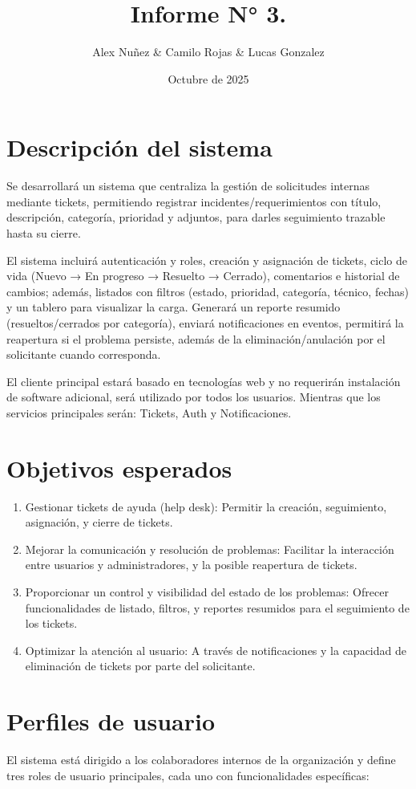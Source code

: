 \documentclass[letter,12pt]{article}
\title{\Huge{Informe N° 3.}}
\author{Alex Nuñez  \& Camilo Rojas \& Lucas Gonzalez}
\date{Octubre de 2025}
\begin{document}
\maketitle
\tableofcontents
\newpage

\section{Descripción del sistema}
Se desarrollará un sistema que centraliza la gestión de solicitudes internas mediante tickets, permitiendo registrar incidentes/requerimientos con título, descripción, categoría, prioridad y adjuntos, para darles seguimiento trazable hasta su cierre.

El sistema incluirá autenticación y roles, creación y asignación de tickets, ciclo de vida (Nuevo → En progreso → Resuelto → Cerrado), comentarios e historial de cambios; además, listados con filtros (estado, prioridad, categoría, técnico, fechas) y un tablero para visualizar la carga. Generará un reporte resumido (resueltos/cerrados por categoría), enviará notificaciones en eventos, permitirá la reapertura si el problema persiste, además de la eliminación/anulación por el solicitante cuando corresponda.

El cliente principal estará basado en tecnologías web y no requerirán instalación de software adicional, será utilizado por todos los usuarios. Mientras que los servicios principales serán: Tickets, Auth y Notificaciones.

\section{Objetivos esperados}
\begin{enumerate}
    \item Gestionar tickets de ayuda (help desk): Permitir la creación, seguimiento, asignación, y cierre de tickets.
    \item Mejorar la comunicación y resolución de problemas: Facilitar la interacción entre usuarios y administradores, y la posible reapertura de tickets.
    \item Proporcionar un control y visibilidad del estado de los problemas: Ofrecer funcionalidades de listado, filtros, y reportes resumidos para el seguimiento de los tickets.
    \item Optimizar la atención al usuario: A través de notificaciones y la capacidad de eliminación de tickets por parte del solicitante.
\end{enumerate}
\section{Perfiles de usuario}
El sistema está dirigido a los colaboradores internos de la organización y define tres roles de usuario principales, cada uno con funcionalidades específicas:
\end{document}
